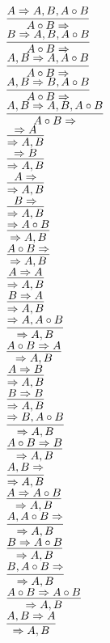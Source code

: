 \documentclass[11pt]{article}
\begin{document}
\begin{center}
\bigskip
\\$\infer{A\circ B\Rightarrow }{A\Rightarrow A, B, A\circ B}$
\bigskip
\\$\infer{A\circ B\Rightarrow }{B\Rightarrow A, B, A\circ B}$
\bigskip
\\$\infer{A\circ B\Rightarrow }{A, B\Rightarrow A, A\circ B}$
\bigskip
\\$\infer{A\circ B\Rightarrow }{A, B\Rightarrow B, A\circ B}$
\bigskip
\\$\infer{A\circ B\Rightarrow }{A, B\Rightarrow A, B, A\circ B}$
\bigskip
\\$\infer{\Rightarrow A, B}{\Rightarrow A}$
\bigskip
\\$\infer{\Rightarrow A, B}{\Rightarrow B}$
\bigskip
\\$\infer{\Rightarrow A, B}{A\Rightarrow }$
\bigskip
\\$\infer{\Rightarrow A, B}{B\Rightarrow }$
\bigskip
\\$\infer{\Rightarrow A, B}{\Rightarrow A\circ B}$
\bigskip
\\$\infer{\Rightarrow A, B}{A\circ B\Rightarrow }$
\bigskip
\\$\infer{\Rightarrow A, B}{A\Rightarrow A}$
\bigskip
\\$\infer{\Rightarrow A, B}{B\Rightarrow A}$
\bigskip
\\$\infer{\Rightarrow A, B}{\Rightarrow A, A\circ B}$
\bigskip
\\$\infer{\Rightarrow A, B}{A\circ B\Rightarrow A}$
\bigskip
\\$\infer{\Rightarrow A, B}{A\Rightarrow B}$
\bigskip
\\$\infer{\Rightarrow A, B}{B\Rightarrow B}$
\bigskip
\\$\infer{\Rightarrow A, B}{\Rightarrow B, A\circ B}$
\bigskip
\\$\infer{\Rightarrow A, B}{A\circ B\Rightarrow B}$
\bigskip
\\$\infer{\Rightarrow A, B}{A, B\Rightarrow }$
\bigskip
\\$\infer{\Rightarrow A, B}{A\Rightarrow A\circ B}$
\bigskip
\\$\infer{\Rightarrow A, B}{A, A\circ B\Rightarrow }$
\bigskip
\\$\infer{\Rightarrow A, B}{B\Rightarrow A\circ B}$
\bigskip
\\$\infer{\Rightarrow A, B}{B, A\circ B\Rightarrow }$
\bigskip
\\$\infer{\Rightarrow A, B}{A\circ B\Rightarrow A\circ B}$
\bigskip
\\$\infer{\Rightarrow A, B}{A, B\Rightarrow A}$

\end{center}
\end{document}
